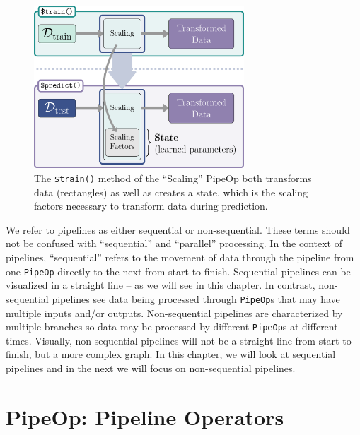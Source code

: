 \begin{figure}

{\centering \includegraphics[width=0.7\textwidth,height=\textheight]{chapters/chapter7/Figures/mlr3book_figures-23.png}

}

\caption{\label{fig-pipelines-state}The \texttt{\$train()} method of the
``Scaling'' PipeOp both transforms data (rectangles) as well as creates
a state, which is the scaling factors necessary to transform data during
prediction.}

\end{figure}

We refer to pipelines as either sequential or non-sequential. These
terms should not be confused with ``sequential'' and ``parallel''
processing. In the context of pipelines, ``sequential'' refers to the
movement of data through the pipeline from one \texttt{PipeOp} directly
to the next from start to finish. Sequential pipelines can be visualized
in a straight line -- as we will see in this chapter. In contrast,
non-sequential pipelines see data being processed through
\texttt{PipeOp}s that may have multiple inputs and/or outputs.
Non-sequential pipelines are characterized by multiple branches so data
may be processed by different \texttt{PipeOp}s at different times.
Visually, non-sequential pipelines will not be a straight line from
start to finish, but a more complex graph. In this chapter, we will look
at sequential pipelines and in the next we will focus on non-sequential
pipelines.

\hypertarget{sec-pipelines-pipeops}{%
\section{PipeOp: Pipeline Operators}\label{sec-pipelines-pipeops}}

